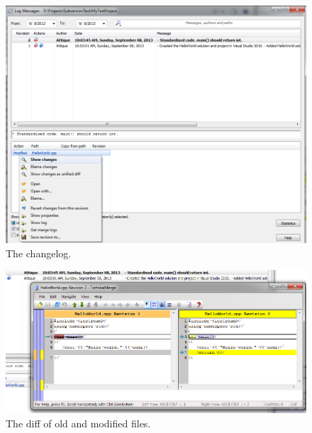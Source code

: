 \documentclass[12pt,a4paper]{article}
\begin{document}
\begin{figure}[H]
\centering
\includegraphics[scale=0.65]{ChangeLog.png}
\caption{The changelog.}
\label{changelog}
\end{figure}
\begin{figure}[H]
\centering
\includegraphics[scale=0.65]{DiffViewer.png}
\caption{The diff of old and modified files.}
\label{diff}
\end{figure}
\end{document}
